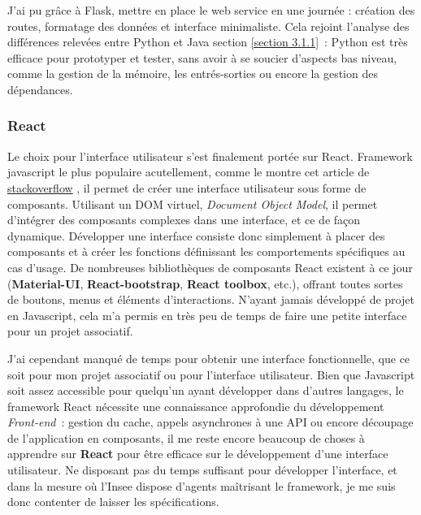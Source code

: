 J'ai pu grâce à Flask, mettre en place le web service en une journée : création des routes, formatage des données et interface minimaliste. Cela rejoint l'analyse des différences relevées entre Python et Java section \ref{section 3.1.1}~: Python est très efficace pour prototyper et tester, sans avoir à se soucier d'aspects bas niveau, comme la gestion de la mémoire, les entrés-sorties ou encore la gestion des dépendances.
\label{section 3.2.2 - Flask}

\subsubsection*{React}
Le choix pour l'interface utilisateur s'est finalement portée sur React. Framework javascript le plus populaire acutellement, comme le montre cet article de \href{https://stackoverflow.blog/2018/01/11/brutal-lifecycle-javascript-frameworks/}{stackoverflow} \cite{stackoverflow-javascript}, il permet de créer une interface utilisateur sous forme de composants. Utilisant un DOM virtuel, \textit{Document Object Model}, il permet d'intégrer des composants complexes dans une interface, et ce de façon dynamique. Développer une interface consiste donc simplement à placer des composants et à créer les fonctions définissant les comportements spécifiques au cas d'usage. De nombreuses bibliothèques de composants React existent à ce jour (\textbf{Material-UI}, \textbf{React-bootstrap}, \textbf{React toolbox}, etc.), offrant toutes sortes de boutons, menus et éléments d'interactions. N'ayant jamais développé de projet en Javascript, cela m'a permis en très peu de temps de faire une petite interface pour un projet associatif.
\newline

J'ai cependant manqué de temps pour obtenir une interface fonctionnelle, que ce soit pour mon projet associatif ou pour l'interface utilisateur. Bien que Javascript soit assez accessible pour quelqu'un ayant développer dans d'autres langages, le framework React nécessite une connaissance approfondie du développement \textit{Front-end}~: gestion du cache, appels asynchrones à une API ou encore découpage de l'application en composants, il me reste encore beaucoup de choses à apprendre sur \textbf{React} pour être efficace sur le développement d'une interface utilisateur. Ne disposant pas du temps suffisant pour développer l'interface, et dans la mesure où l'Insee dispose d'agents maîtrisant le framework, je me suis donc contenter de laisser les spécifications.
\newline

